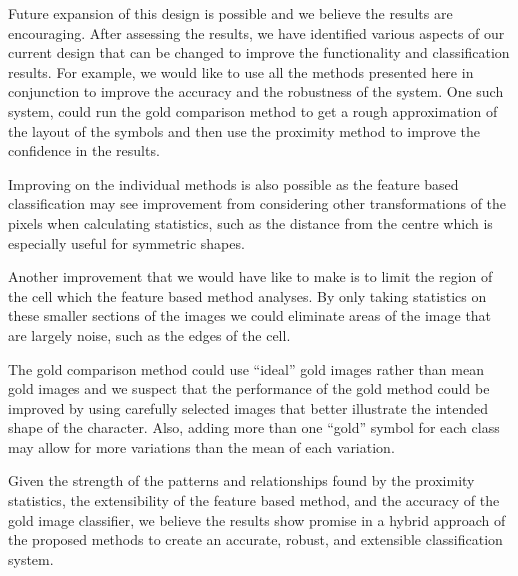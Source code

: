 
Future expansion of this design is possible and we believe the results are
encouraging.  After assessing the results, we have identified various aspects
of our current design that can be changed to improve the functionality and
classification results. For example, we would like to use all the methods
presented here in conjunction to improve the accuracy and the robustness of the
system.  One such system, could run the gold comparison method to get a rough
approximation of the layout of the symbols and then use the proximity method to
improve the confidence in the results. 

Improving on the individual methods is also possible as the feature based
classification may see improvement from considering other transformations of
the pixels when calculating statistics, such as the distance from the centre
which is especially useful for symmetric shapes. 

Another improvement that we would have like to make is to limit the
region of the cell which the feature based method analyses.  By only taking
statistics on these smaller sections of the images we could eliminate areas of
the image that are largely noise, such as the edges of the cell.

The gold comparison method could use ``ideal'' gold images rather than mean
gold images and we suspect that the performance of the gold method could be
improved by using carefully selected images that better illustrate the intended
shape of the character. Also, adding more than one ``gold'' symbol for each
class may allow for more variations than the mean of each variation.

Given the strength of the patterns and relationships found by the proximity
statistics, the extensibility of the feature based method, and the accuracy of
the gold image classifier, we believe the results show promise in a hybrid
approach of the proposed methods to create an accurate, robust, and extensible
classification system.

